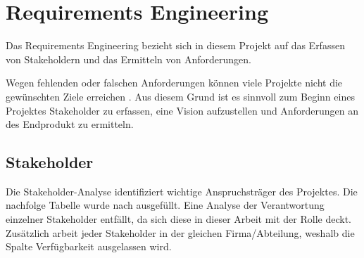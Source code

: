 \chapter{Requirements Engineering}
\label{ch:requirements}

Das Requirements Engineering bezieht sich in diesem Projekt auf das Erfassen von Stakeholdern und das Ermitteln von Anforderungen.

Wegen fehlenden oder falschen Anforderungen können viele Projekte nicht die gewünschten Ziele
erreichen \cite[S.~4-9]{Ebert:SystematischesReqEng}. Aus diesem Grund ist es sinnvoll zum Beginn eines Projektes Stakeholder zu erfassen,
eine Vision aufzustellen und Anforderungen an des Endprodukt zu ermitteln.


\section{Stakeholder}
\label{sec:stakeholder}

Die Stakeholder-Analyse identifiziert wichtige Anspruchsträger des Projektes.
Die nachfolge Tabelle wurde nach \cite[S.~58-60]{Ebert:SystematischesReqEng} ausgefüllt.
Eine Analyse der Verantwortung einzelner Stakeholder entfällt, da sich diese in dieser Arbeit mit der Rolle deckt. Zusätzlich arbeit jeder
Stakeholder in der gleichen Firma/Abteilung, weshalb die Spalte \glqq{}Verfügbarkeit\grqq{} ausgelassen wird.

